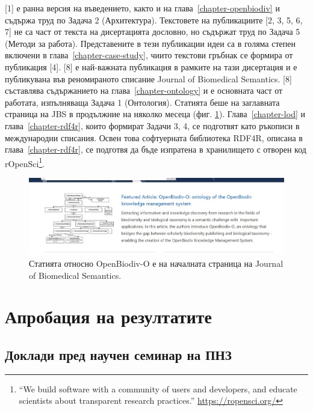 [1] е ранна версия на въведението, както и на глава~\ref{chapter-openbiodiv} и съдържа труд по Задача 2 (Архитектура). Текстовете на публикациите [2, 3, 5, 6, 7] не са част от текста на дисертацията дословно, но съдържат труд по Задача 5 (Методи за работа). Представените в тези публикации идеи са в голяма степен включени в глава~\ref{chapter-case-study}, чиито текстови гръбнак се формира от публикация [4]. [8] е най-важната публикация в рамките на тази дисертация и е публикувана във реномираното списание Journal of Biomedical Semantics. [8] съставлява съдържанието на глава~\ref{chapter-ontology} и е основната част от работата, изпълняваща Задача 1 (Онтология). Статията беше на заглавната страница на JBS в продължние на няколко месеца (фиг. \ref{fig:jbs-featured}). Глава~\ref{chapter-lod} и глава~\ref{chapter-rdf4r}, които формират Задачи 3, 4, се подготвят като ръкописи в международни списания. Освен това софтуерната библиотека RDF4R, описана в глава~\ref{chapter-rdf4r}, се подготвя да бъде изпратена в хранилището с отворен код rOpenSci\footnote{``We build software with a community of users and developers, and educate scientists about transparent research practices.'' \url{https://ropensci.org/}}.



\begin{figure}
\centering
\includegraphics[width=\textwidth]{Figures/JBS-featured.jpg}
\decoRule
\caption{Статията относно OpenBiodiv-O е на началната страница на Journal of Biomedical Semantics.}
\label{fig:jbs-featured}
\end{figure}

\section*{Апробация на резултатите}

\subsection*{Доклади пред научен семинар на ПНЗ}


